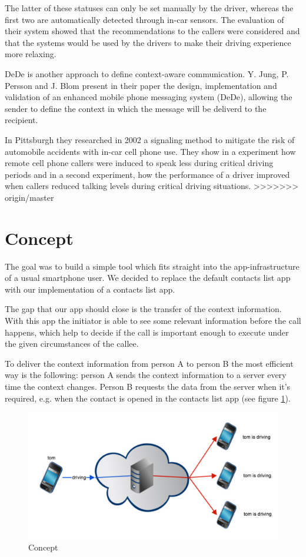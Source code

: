 \documentclass{sigchi}
\begin{document}
 The latter of these statuses can only be set manually by the driver, whereas the first two are automatically detected through in-car sensors. The evaluation of their system showed that the recommendations to the callers were considered and that the systems would be used by the drivers to make their driving experience more relaxing.
 
 DeDe is another approach to define context-aware communication. Y. Jung, P. Persson and J. Blom present in their paper \cite{jung05} the design, implementation and validation of an enhanced mobile phone messaging system (DeDe), allowing the sender to define the context in which the message will be deliverd to the recipient.
 
 In Pittsburgh they researched in 2002 \cite{samar02} a signaling method to mitigate the risk of automobile accidents with in-car cell phone use. They show in a experiment how remote cell phone callers were induced to speak less during critical driving periods and in a second experiment, how the performance of a driver improved when callers reduced talking levels during critical driving situations.
>>>>>>> origin/master

\section{Concept}
The goal was to build a simple tool which fits straight into the app-infrastructure of a usual smartphone user. We decided to replace the default contacts list app with our implementation of a contacts list app.

The gap that our app should close is the transfer of the context information. With this app the initiator is able to see some relevant information before the call happens, which help to decide if the call is important enough to execute under the given circumstances of the callee.

To deliver the context information from person A to person B the most efficient way is the following:
person A sends the context information to a server every time the context changes. Person B requests the data from the server when it's required, e.g. when the contact is opened in the contacts list app (see figure \ref{fig:app_concept}).

\begin{figure}[H]
	\centering
		\includegraphics[width=.95\linewidth]{figures/concept}
		\caption{Concept}
	\label{fig:app_concept}
\end{figure}
\end{document}
